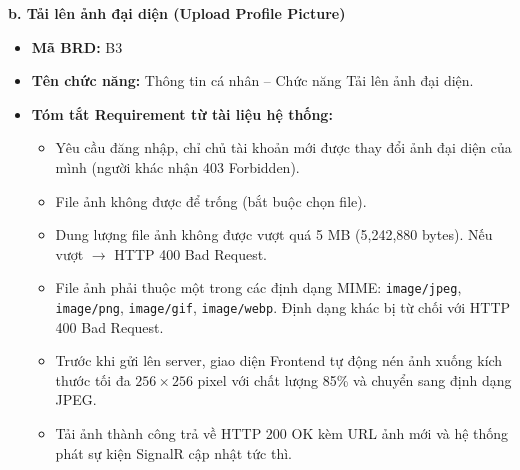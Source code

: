 \documentclass[11pt,a4paper]{article}
\begin{document}
\noindent\textbf{b. Tải lên ảnh đại diện (Upload Profile Picture)}
\begin{itemize}[leftmargin=1.2cm, noitemsep]
    \item[\textbf{--}] \textbf{Mã BRD:} B3
    \item[\textbf{--}] \textbf{Tên chức năng:} Thông tin cá nhân -- Chức năng Tải lên ảnh đại diện.
    \item[\textbf{--}] \textbf{Tóm tắt Requirement từ tài liệu hệ thống:}
    \begin{itemize}[leftmargin=0.8cm, label=$\bullet$, noitemsep]
        \item Yêu cầu đăng nhập, chỉ chủ tài khoản mới được thay đổi ảnh đại diện của mình (người khác nhận 403 Forbidden).
        \item File ảnh không được để trống (bắt buộc chọn file).
        \item Dung lượng file ảnh không được vượt quá 5 MB (5,242,880 bytes). Nếu vượt $\rightarrow$ HTTP 400 Bad Request.
        \item File ảnh phải thuộc một trong các định dạng MIME: \texttt{image/jpeg}, \texttt{image/png}, \texttt{image/gif}, \texttt{image/webp}. Định dạng khác bị từ chối với HTTP 400 Bad Request.
        \item Trước khi gửi lên server, giao diện Frontend tự động nén ảnh xuống kích thước tối đa $256\times256$ pixel với chất lượng 85\% và chuyển sang định dạng JPEG.
        \item Tải ảnh thành công trả về HTTP 200 OK kèm URL ảnh mới và hệ thống phát sự kiện SignalR cập nhật tức thì.
    \end{itemize}
\end{itemize}
\end{document}
